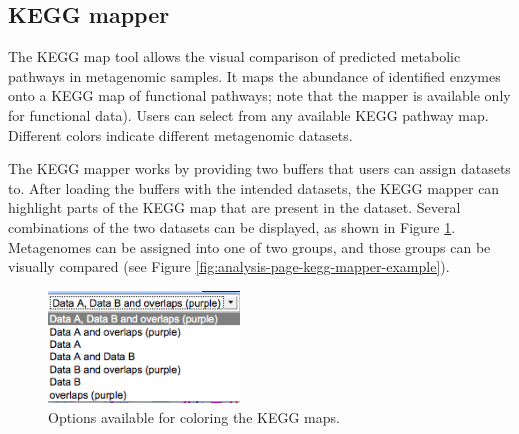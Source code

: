 \documentclass[12pt,fullpage]{report}
\begin{document}
\subsection{KEGG mapper}
\label{section:kegg-mapper}

The KEGG map tool allows the visual comparison of predicted metabolic pathways in metagenomic samples.
It maps the abundance of identified enzymes onto a KEGG \cite{KEGG} map of functional pathways; note that the mapper is available only for functional data).
Users can select from any available KEGG pathway map.
Different colors indicate different metagenomic datasets.

The KEGG mapper works by providing two buffers that users can assign datasets to.
After loading the buffers with the intended datasets, the KEGG mapper can highlight parts of the KEGG map that are present in the dataset.
Several combinations of the two datasets can be displayed, as shown in Figure \ref{fig:analysis-page-kegg-mapper-options}.
Metagenomes can be assigned into one of two groups, and those groups can be visually compared
(see Figure \ref{fig:analysis-page-kegg-mapper-example}).

\begin{figure}
\begin{center}
\includegraphics[width=2in]{Images/analysis-page-kegg-mapper-options.png}
\end{center}
\caption{Options available for coloring the KEGG maps.}
\label{fig:analysis-page-kegg-mapper-options}
\end{figure}
\end{document}
